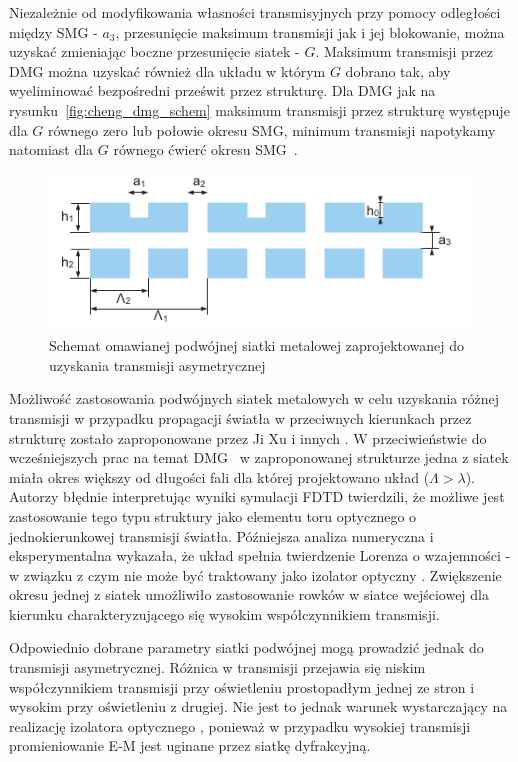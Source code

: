 Niezależnie od modyfikowania własności transmisyjnych przy pomocy odległości między SMG - $a_3$, przesunięcie maksimum transmisji jak i jej blokowanie, można uzyskać zmieniając boczne przesunięcie siatek - $G$. Maksimum transmisji przez DMG można uzyskać również dla układu w którym $G$ dobrano tak, aby wyeliminować bezpośredni prześwit przez strukturę. Dla DMG jak na rysunku~\ref{fig:cheng_dmg_schem} maksimum transmisji przez strukturę występuje dla $G$ równego zero lub połowie okresu SMG, minimum transmisji napotykamy natomiast dla $G$ równego ćwierć okresu SMG~\cite{chan2006optical}.

\begin{figure}[tb]
	\includegraphics[width=\textwidth]{images/thz/1D-DMG-schemat.png}
	\caption{Schemat omawianej podwójnej siatki metalowej zaprojektowanej do uzyskania transmisji asymetrycznej}
	\label{fig:1ddmg-schem}
\end{figure}


Możliwość zastosowania podwójnych siatek metalowych w celu uzyskania różnej transmisji w przypadku propagacji światła w przeciwnych kierunkach przez strukturę zostało zaproponowane przez Ji Xu i innych \cite{xu2011unidirectional}. W przeciwieństwie do wcześniejszych prac na temat DMG~\cite{cheng2007controllable,cheng2008physical,chan2006optical} w zaproponowanej strukturze jedna z siatek miała okres większy od długości fali dla której projektowano układ ($\Lambda>\lambda$). Autorzy błędnie interpretując wyniki symulacji FDTD twierdzili, że możliwe jest zastosowanie tego typu struktury jako elementu toru optycznego o jednokierunkowej transmisji światła. Późniejsza analiza numeryczna i eksperymentalna wykazała, że układ spełnia twierdzenie Lorenza o wzajemności - w związku z czym nie może być  traktowany jako izolator optyczny \cite{jalas2013and}. Zwiększenie okresu jednej z siatek umożliwiło zastosowanie rowków w siatce wejściowej dla kierunku charakteryzującego się wysokim współczynnikiem transmisji\cite{xu2011unidirectional}.

Odpowiednio dobrane parametry siatki podwójnej mogą prowadzić jednak do transmisji asymetrycznej. Różnica w transmisji przejawia się niskim współczynnikiem transmisji przy oświetleniu prostopadłym jednej ze stron i wysokim przy oświetleniu z drugiej. Nie jest to jednak warunek wystarczający na realizację izolatora optycznego \cite{jalas2013and}, ponieważ w przypadku wysokiej transmisji promieniowanie E-M jest uginane przez siatkę dyfrakcyjną. 

